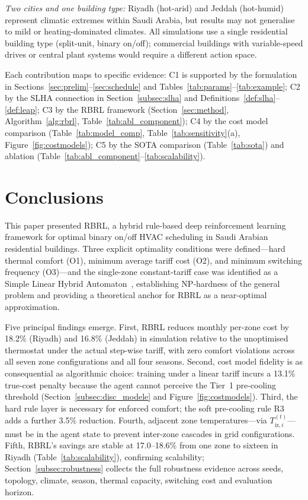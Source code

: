 \documentclass[3p,number]{elsarticle}
\let\oldsection\section
\renewcommand{\section}{\FloatBarrier\oldsection}
\newcommand{\Tiz}[1]{T_{\mathrm{iz},#1}}
\begin{document}
\emph{Two cities and one building type:} Riyadh (hot-arid) and Jeddah (hot-humid) represent climatic extremes within Saudi Arabia, but results may not generalise to mild or heating-dominated climates.
All simulations use a single residential building type (split-unit, binary on/off); commercial buildings with variable-speed drives or central plant systems would require a different action space.
 
Each contribution maps to specific evidence: C1 is supported by the formulation in Sections~\ref{sec:prelim}--\ref{sec:schedule} and Tables~\ref{tab:params}--\ref{tab:example}; C2 by the SLHA connection in Section~\ref{subsec:slha} and Definitions~\ref{def:slha}--\ref{def:leap}; C3 by the RBRL framework (Section~\ref{sec:method}, Algorithm~\ref{alg:rbrl}, Table~\ref{tab:abl_component}); C4 by the cost model comparison (Table~\ref{tab:model_comp}, Table~\ref{tab:sensitivity}(a), Figure~\ref{fig:costmodels}); C5 by the SOTA comparison (Table~\ref{tab:sota}) and ablation (Table~\ref{tab:abl_component}--\ref{tab:scalability}).
 
\section{Conclusions}
\label{sec:conclusion}
 
This paper presented RBRL, a hybrid rule-based deep reinforcement learning framework for optimal binary on/off HVAC scheduling in Saudi Arabian residential buildings.
Three explicit optimality conditions were defined---hard thermal comfort (O1), minimum average tariff cost (O2), and minimum switching frequency (O3)---and the single-zone constant-tariff case was identified as a Simple Linear Hybrid Automaton~\cite{Mousa2016}, establishing NP-hardness of the general problem and providing a theoretical anchor for RBRL as a near-optimal approximation.
 
Five principal findings emerge.
First, RBRL reduces monthly per-zone cost by 18.2\% (Riyadh) and 16.8\% (Jeddah) in simulation relative to the unoptimised thermostat under the actual step-wise tariff, with zero comfort violations across all seven zone configurations and all four seasons.
Second, cost model fidelity is as consequential as algorithmic choice: training under a linear tariff incurs a 13.1\% true-cost penalty because the agent cannot perceive the Tier~1 pre-cooling threshold (Section~\ref{subsec:disc_modele} and Figure~\ref{fig:costmodels}).
Third, the hard rule layer is necessary for enforced comfort; the soft pre-cooling rule R3 adds a further 3.5\% reduction.
Fourth, adjacent zone temperatures---via $\Tiz{i}^{(t)}$---must be in the agent state to prevent inter-zone cascades in grid configurations.
Fifth, RBRL's savings are stable at 17.0--18.6\% from one zone to sixteen in Riyadh (Table~\ref{tab:scalability}), confirming scalability; Section~\ref{subsec:robustness} collects the full robustness evidence across seeds, topology, climate, season, thermal capacity, switching cost and evaluation horizon.
 
\end{document}

